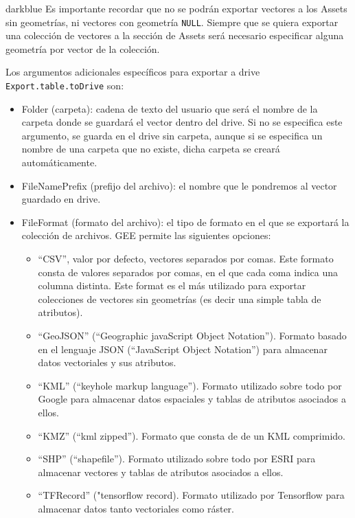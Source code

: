 \documentclass[
  12pt,
  letterpaper,
  twoside]{book}
\providecommand{\tightlist}{%
  \setlength{\itemsep}{0pt}\setlength{\parskip}{0pt}}
\begin{document}
\begin{bluebox2}

\begin{awesomeblock}{5pt}{\faLightbulb}{darkblue}
Es importante recordar que no se podrán exportar vectores a los Assets sin geometrías, ni vectores con geometría \texttt{NULL}. Siempre que se quiera exportar una colección de vectores a la sección de Assets será necesario especificar alguna geometría por vector de la colección.

\end{awesomeblock}

\end{bluebox2}

Los argumentos adicionales específicos para exportar a drive \texttt{Export.table.toDrive} son:

\begin{itemize}
\item
  Folder (carpeta): cadena de texto del usuario que será el nombre de la carpeta donde se guardará el vector dentro del drive. Si no se especifica este argumento, se guarda en el drive sin carpeta, aunque si se especifica un nombre de una carpeta que no existe, dicha carpeta se creará automáticamente.
\item
  FileNamePrefix (prefijo del archivo): el nombre que le pondremos al vector guardado en drive.
\item
  FileFormat (formato del archivo): el tipo de formato en el que se exportará la colección de archivos. GEE permite las siguientes opciones:

  \begin{itemize}
  \tightlist
  \item
    ``CSV'', valor por defecto, vectores separados por comas. Este formato consta de valores separados por comas, en el que cada coma indica una columna distinta. Este format es el más utilizado para exportar colecciones de vectores sin geometrías (es decir una simple tabla de atributos).
  \item
    ``GeoJSON'' (``Geographic javaScript Object Notation''). Formato basado en el lenguaje JSON (``JavaScript Object Notation'') para almacenar datos vectoriales y sus atributos.
  \item
    ``KML'' (``keyhole markup language''). Formato utilizado sobre todo por Google para almacenar datos espaciales y tablas de atributos asociados a ellos.
  \item
    ``KMZ'' (``kml zipped''). Formato que consta de de un KML comprimido.
  \item
    ``SHP'' (``shapefile''). Formato utilizado sobre todo por ESRI para almacenar vectores y tablas de atributos asociados a ellos.
  \item
    ``TFRecord'' ("tensorflow record). Formato utilizado por Tensorflow para almacenar datos tanto vectoriales como ráster.
  \end{itemize}
\end{itemize}
\end{document}
